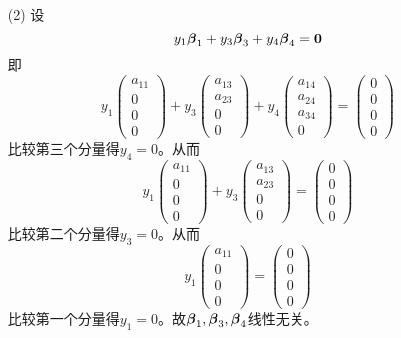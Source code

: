 \begin{frame}[allowframebreaks]
\begin{itemize}
\item[(2)] 设
  $$
  y_1\betabd_1 + y_3\betabd_3 + y_4\betabd_4=\M0
  $$
  即
  $$
  y_1\left(
    \begin{array}{c}
      a_{11}\\
      0\\
      0\\
      0
    \end{array}
  \right) + y_3\left(
    \begin{array}{c}
      a_{13}\\
      a_{23}\\
      0\\
      0
    \end{array}
  \right) + y_4\left(
    \begin{array}{c}
      a_{14}\\
      a_{24}\\
      a_{34}\\
      0
    \end{array}
  \right) = \left(
    \begin{array}{c}
      0\\
      0\\
      0\\
      0
    \end{array}
  \right)
  $$
  比较第三个分量得$y_4=0$。从而
  $$
  y_1\left(
    \begin{array}{c}
      a_{11}\\
      0\\
      0\\
      0
    \end{array}
  \right) + y_3\left(
    \begin{array}{c}
      a_{13}\\
      a_{23}\\
      0\\
      0
    \end{array}
  \right) = \left(
    \begin{array}{c}
      0\\
      0\\
      0\\
      0
    \end{array}
  \right)
  $$比较第二个分量得$y_3=0$。从而
  $$
  y_1\left(
    \begin{array}{c}
      a_{11}\\
      0\\
      0\\
      0
    \end{array}
  \right) = \left(
    \begin{array}{c}
      0\\
      0\\
      0\\
      0
    \end{array}
  \right)
  $$ 比较第一个分量得$y_1=0$。故$\boldsymbol{\beta}_1,\boldsymbol{\beta}_3,\boldsymbol{\beta}_4$线性无关。
\end{itemize}
\end{frame}


